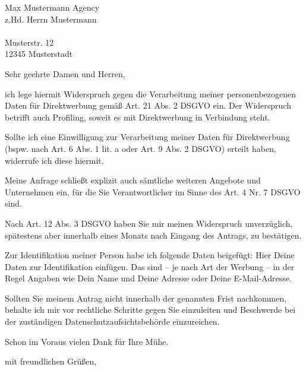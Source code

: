 \documentclass[a4paper, pagenumber=footmiddle, parskip=half,
	foldmarks=true,foldmarks=BmT,
	fromalign=right,  %
	fromphone=false, fromfax=false, fromemail=true, fromurl=true, fromlogo=true,
	fromrule=false, version=last]{scrlttr2}
\begin{document}
\begin{letter}{
	Max Mustermann Agency\\ 
	z.Hd. Herrn Mustermann\\ \ \\
	Musterstr. 12\\
	12345 Musterstadt
}
\flushleft
\opening{Sehr geehrte Damen und Herren,}

ich lege hiermit Widerspruch gegen die Verarbeitung meiner personenbezogenen Daten für Direktwerbung gemäß Art. 21 Abs. 2 DSGVO ein. Der Widerspruch betrifft auch Profiling, soweit es mit Direktwerbung in Verbindung steht.

Sollte ich eine Einwilligung zur Verarbeitung meiner Daten für Direktwerbung (bspw. nach Art. 6 Abs. 1 lit. a oder Art. 9 Abs. 2 DSGVO) erteilt haben, widerrufe ich diese hiermit.

Meine Anfrage schließt explizit auch sämtliche weiteren Angebote und Unternehmen ein, für die Sie Verantwortlicher im Sinne des Art. 4 Nr. 7 DSGVO sind.

Nach Art. 12 Abs. 3 DSGVO haben Sie mir meinen Widerspruch unverzüglich, spätestens aber innerhalb eines Monats nach Eingang des Antrags, zu bestätigen.

Zur Identifikation meiner Person habe ich folgende Daten beigefügt:
Hier Deine Daten zur Identifikation einfügen. Das sind – je nach Art der Werbung – in der Regel Angaben wie Dein Name und Deine Adresse oder Deine E-Mail-Adresse.

Sollten Sie meinem Antrag nicht innerhalb der genannten Frist nachkommen, behalte ich mir vor rechtliche Schritte gegen Sie einzuleiten und Beschwerde bei der zuständigen Datenschutzaufsichtsbehörde einzureichen.

Schon im Voraus vielen Dank für Ihre Mühe.


\closing{mit freundlichen Grüßen,}


\end{letter}
\end{document}
